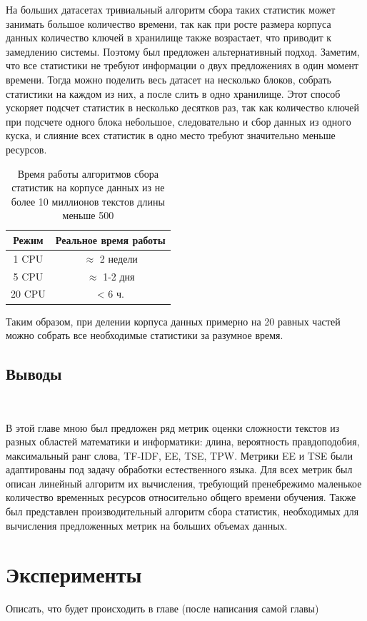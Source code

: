 \documentclass{spbau-diploma}
\begin{document}
На больших датасетах тривиальный алгоритм сбора таких статистик может занимать большое количество времени, так как при росте размера корпуса данных количество ключей в хранилище также возрастает, что приводит к замедлению системы. Поэтому был предложен альтернативный подход. Заметим, что все статистики не требуют информации о двух предложениях в один момент времени. Тогда можно поделить весь датасет на несколько блоков, собрать статистики на каждом из них, а после слить в одно хранилище. Этот способ ускоряет подсчет статистик в несколько десятков раз, так как количество ключей при подсчете одного блока небольшое, следовательно и сбор данных из одного куска, и слияние всех статистик в одно место требуют значительно меньше ресурсов.

\begin{table}[h]
	\caption{Время работы алгоритмов сбора статистик на корпусе данных из не более 10 миллионов текстов длины меньше 500}
	\label{table:collect_stats_time}
	\centering
	\begin{tabular}{|c|c|}
		\hline
		Режим & Реальное время работы \\
		\hline
		1 CPU & $\approx$ 2 недели \\
		5 CPU & $\approx$ 1-2 дня \\
		20 CPU & < 6 ч. \\
		\hline
	\end{tabular}
\end{table}

Таким образом, при делении корпуса данных примерно на 20 равных частей можно собрать все необходимые статистики за разумное время.
\pagebreak
\subsection{Выводы}
\ 

В этой главе мною был предложен ряд метрик оценки сложности текстов из разных областей математики и информатики: длина, вероятность правдоподобия, максимальный ранг слова, TF-IDF, EE, TSE, TPW. Метрики EE и TSE были адаптированы под задачу обработки естественного языка. Для всех метрик был описан линейный алгоритм их вычисления, требующий пренебрежимо маленькое количество временных ресурсов относительно общего времени обучения. Также был представлен производительный алгоритм сбора статистик, необходимых для вычисления предложенных метрик на больших объемах данных.

\section{Эксперименты} \label{sec:experiments}
Описать, что будет происходить в главе (после написания самой главы)
\end{document}
